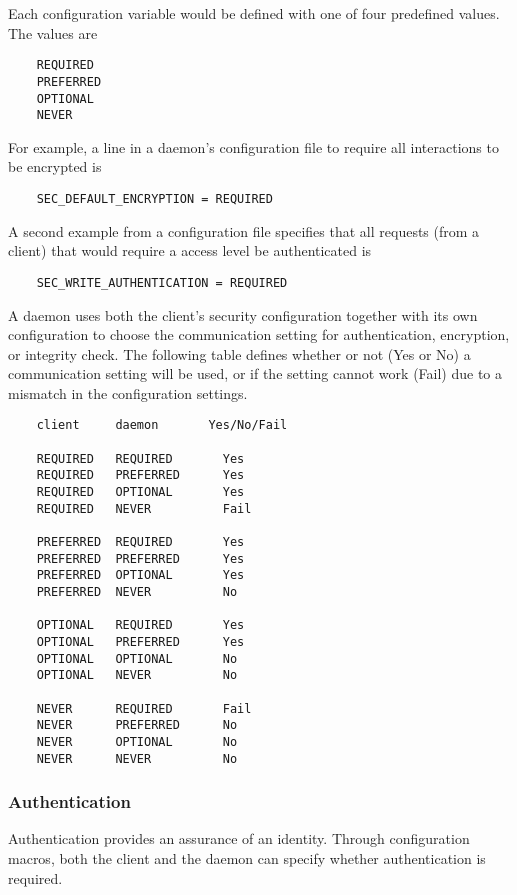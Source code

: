 Each configuration variable would be defined with one
of four predefined values.
The values are
\begin{verbatim}
    REQUIRED
    PREFERRED
    OPTIONAL
    NEVER 
\end{verbatim}
For example, a line in a daemon's configuration file
to require all interactions to be encrypted is
\begin{verbatim}
    SEC_DEFAULT_ENCRYPTION = REQUIRED
\end{verbatim}
A second example from a configuration file specifies that all
requests (from a client) that would require a 
access level be authenticated is
\begin{verbatim}
    SEC_WRITE_AUTHENTICATION = REQUIRED
\end{verbatim}

A daemon uses both the client's security configuration
together with its own configuration to choose the communication
setting
for authentication, encryption, or integrity check.
The following table defines whether or not (Yes or No) a
communication setting will be used, or if the setting cannot
work (Fail) due to a mismatch in the configuration settings.

\begin{verbatim}
    client     daemon       Yes/No/Fail

    REQUIRED   REQUIRED       Yes
    REQUIRED   PREFERRED      Yes
    REQUIRED   OPTIONAL       Yes
    REQUIRED   NEVER          Fail

    PREFERRED  REQUIRED       Yes
    PREFERRED  PREFERRED      Yes
    PREFERRED  OPTIONAL       Yes
    PREFERRED  NEVER          No

    OPTIONAL   REQUIRED       Yes
    OPTIONAL   PREFERRED      Yes
    OPTIONAL   OPTIONAL       No
    OPTIONAL   NEVER          No

    NEVER      REQUIRED       Fail
    NEVER      PREFERRED      No
    NEVER      OPTIONAL       No
    NEVER      NEVER          No
\end{verbatim}

\subsubsection{\label{sec:Security-Authentication} Authentication}
Authentication provides an assurance of an identity.
Through configuration macros, both the client and the daemon
can specify whether authentication is required.

